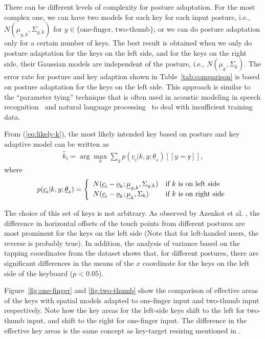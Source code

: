 \documentclass{sigchi}
\begin{document}
There can be different levels of complexity for posture adaptation. For the most complex one, we can have
two models for each key for each input posture, i.e., $N(\underline \mu_{y,k}, \Sigma_{y,k})$ for $y \in
\{\text{one-finger, two-thumb}\}$; or we can do posture adaptation only for a certain
number of keys. The best result is obtained when we only do posture adaptation for the keys on 
the left side, and for the keys on the right side, their Gaussian models are
independent of the posture, i.e., $N(\underline\mu_k, \Sigma_k)$.
The error rate for posture and key adaption shown in Table~\ref{tab:comparison} is based on 
posture adaptation for the keys on the left side. This approach is similar to the ``parameter tying'' technique that is often used in acoustic modeling in speech recognition~\cite{Bellegarda:1989} and natural language processing~\cite{Lin:1995} to deal with insufficient training data.

From (\ref{eq:likely-k}), the most likely intended key based on posture and key adaptive model can be written as
\begin{align}          
\hat k_i = \arg\max_k \sum_{y} p(\underline c_i | k, y; \underline\theta_s)[[y = \textsf{y}]],
\end{align}
where
\begin{align}
p(\underline c_i | k, y; \underline\theta_s) = \left\{
  \begin{array}{l l}
  N(\underline c_i - \underline o_k; \underline \mu_{y, k}, \Sigma_{y,k}) & \text{if $k$ is on left side} \\
  N(\underline c_i - \underline o_k; \underline \mu_{k}, \Sigma_{k}) & \text{if $k$ is on right side} \\
\end{array} \right.
\end{align}

The choice of this set of keys is not arbitrary. As observed by Azenkot et al. \cite{Azenkot:2012}, the difference in horizontal
offsets of the touch points from different postures are most prominent for the keys on the
left side (Note that for left-handed users, the reverse is probably true). 
In addition, the analysis of variance based on the tapping coordinates from the
dataset shows that, for different postures, there are significant differences in the means of
the $x$ coordinate for the keys on the left side of the keyboard ($p < 0.05$). 

Figure~\ref{fig:one-finger} and \ref{fig:two-thumb} show the comparison of effective areas of the keys
with spatial models adapted to one-finger input and two-thumb input respectively. Note how the key areas for the left-side keys shift to the left
for two-thumb input, and shift to the right for one-finger input. The difference in 
the effective key areas is the same concept as key-target resizing mentioned in \cite{Gunawardana:2010, Rudchenko:2011}.
\end{document}
